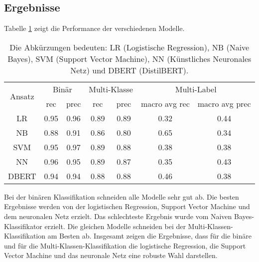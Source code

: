 \subsection{Ergebnisse}
\label{Ergebnisse}
Tabelle \ref{tab:ergebnisse} zeigt die Performance der verschiedenen Modelle.
\begin{table}[ht]
    \centering
    \begin{tabular}{|c|c|c|c|c|c|c|}
        \hline
        \multirow{2}{*}{Ansatz} & \multicolumn{2}{c|}{Binär} & \multicolumn{2}{c|}{Multi-Klasse} & \multicolumn{2}{c|}{Multi-Label}                                         \\
        \cline{2-7}
                                & rec                        & prec                              & rec                              & prec & macro avg rec & macro avg prec \\
        \hline
        LR                      & 0.95                       & 0.96                              & 0.89                             & 0.89 & 0.32          & 0.44           \\
        \hline
        NB                      & 0.88                       & 0.91                              & 0.86                             & 0.80 & 0.65          & 0.34           \\
        \hline
        SVM                     & 0.95                       & 0.97                              & 0.89                             & 0.88 & 0.38          & 0.38           \\
        \hline
        NN                      & 0.96                       & 0.95                              & 0.89                             & 0.87 & 0.35          & 0.43           \\
        \hline
        DBERT                   & 0.94                       & 0.94                              & 0.88                             & 0.88 & 0.46          & 0.38           \\
        \hline
    \end{tabular}
    \caption{Die Abkürzungen bedeuten: LR (Logistische Regression), NB (Naive Bayes), SVM (Support Vector Machine), NN (Künstliches Neuronales Netz) und DBERT (DistilBERT).}
    \label{tab:ergebnisse}
\end{table}

Bei der binären Klassifikation schneiden alle Modelle sehr gut ab. Die besten Ergebnisse werden von der logistischen Regression, Support Vector Machine und dem neuronalen Netz erzielt. Das schlechteste Ergebnis wurde vom Naiven Bayes-Klassifikator erzielt. Die gleichen Modelle schneiden bei der Multi-Klassen-Klassifikation am Besten ab. Insgesamt zeigen die Ergebnisse, dass für die binäre und für die Multi-Klassen-Klassifikation die logistische Regression, die Support Vector Machine und das neuronale Netz eine robuste Wahl darstellen.

